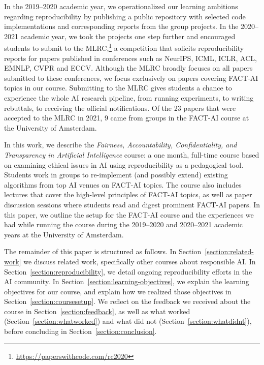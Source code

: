 \documentclass[letterpaper]{article}
\newcommand{\OurUniversity}{the University of Amsterdam}
\begin{document}
In the 2019--2020 academic year, we operationalized our learning ambitions regarding reproducibility by publishing a public repository with selected code implementations and corresponding reports from the group projects.
In the 2020--2021 academic year, we took the projects one step further and encouraged students to submit to the \ac{MLRC},\footnote{\url{https://paperswithcode.com/rc2020}} a competition that solicits reproducibility reports for papers published in conferences such as NeurIPS, ICML, ICLR, ACL, EMNLP, CVPR and ECCV.
Although the MLRC broadly focuses on all papers submitted to these conferences, we focus exclusively on papers covering FACT-AI topics in our course.
Submitting to the MLRC gives students a chance to experience the whole AI research pipeline, from running experiments, to writing rebuttals, to receiving the official notifications.
Of the 23 papers that were accepted to the MLRC in 2021, 9 came from groups in the FACT-AI course at \OurUniversity{}.

In this work, we describe the \textit{Fairness, Accountability, Confidentiality, and Transparency in Artificial Intelligence} course: a one month, full-time course based on examining ethical issues in AI using reproducibility as a pedagogical tool.
Students work in groups to re-implement (and possibly extend) existing algorithms from top AI venues on \ac{FACT-AI} topics.
The course also includes lectures that cover the high-level principles of FACT-AI topics, as well as paper discussion sessions where students read and digest prominent FACT-AI papers.
In this paper, we outline the setup for the \ac{FACT-AI} course and the experiences we had while running the course during the 2019--2020 and 2020--2021 academic years at \OurUniversity{}.

The remainder of this paper is structured as follows.
In Section~\ref{section:related-work} we discuss related work, specifically other courses about responsible AI.
In Section~\ref{section:reproducibility}, we detail ongoing reproducibility efforts in the AI community.
In Section~\ref{section:learning-objectives}, we explain the learning objectives for our course, and explain how we realized those objectives in Section~\ref{section:coursesetup}.
We reflect on the feedback we received about the course in Section~\ref{section:feedback}, as well as what worked (Section~\ref{section:whatworked}) and what did not (Section~\ref{section:whatdidnt}), before concluding in Section~\ref{section:conclusion}.
\end{document}
